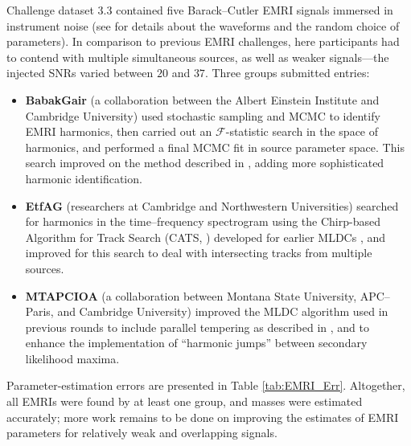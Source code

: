 \documentclass{iopart}
\begin{document}

Challenge dataset 3.3 contained five Barack--Cutler \cite{barackcutler} EMRI signals immersed in instrument noise (see \cite{MLDC3} for details about the waveforms and the random choice of parameters). In comparison to previous EMRI challenges, here participants had to contend with multiple simultaneous sources, as well as weaker signals---the injected SNRs varied between $20$ and $37$. Three groups submitted entries:
%
\begin{itemize}
\item \textbf{BabakGair} (a collaboration between the Albert Einstein Institute and Cambridge University) used stochastic sampling and MCMC to identify EMRI harmonics, then carried out an $\mathcal{F}$-statistic search in the space of harmonics, and performed a final MCMC fit in source parameter space. This search improved on the method described in \cite{BabakGairPorter}, adding more sophisticated harmonic identification.
\item \textbf{EtfAG} (researchers at Cambridge and Northwestern Universities) searched for harmonics in the time--frequency spectrogram using the Chirp-based Algorithm for Track Search (CATS, \cite{CATS}) developed for earlier MLDCs \cite{GairMandelWen}, and improved for this search to deal with intersecting tracks from multiple sources.
\item \textbf{MTAPCIOA} (a collaboration between Montana State University, APC--Paris, and Cambridge University) improved the MLDC algorithm used in previous rounds \cite{Cornish:2008} to include parallel tempering as described in \cite{keycornish}, and to enhance the implementation of ``harmonic jumps'' between secondary likelihood maxima. 
\end{itemize}
%
Parameter-estimation errors are presented in Table \ref{tab:EMRI_Err}.
Altogether, all EMRIs were found by at least one group, and masses were estimated accurately; more work remains to be done on improving the estimates of EMRI parameters for relatively weak and overlapping signals.
\end{document}
